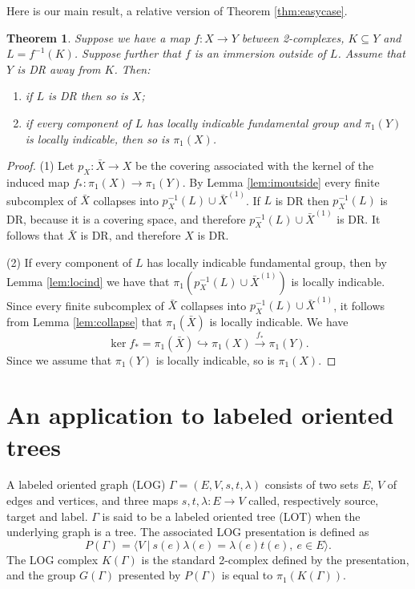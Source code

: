\documentclass[12pt]{amsart}
\newtheorem{thm}{Theorem}[section]
\theoremstyle{definition}
\begin{document}
Here is our main result, a relative version of Theorem \ref{thm:easycase}.

\begin{thm}\label{thm:good} Suppose we have a map $f\colon X\to Y$ between 2-complexes, $K\subseteq Y$ and $L=f^{-1}(K)$. Suppose further that $f$ is an immersion outside of $L$. Assume that $Y$ is DR away from $K$. Then:
\begin{enumerate}
    \item if $L$ is DR then so is $X$;
    \item if every component of $L$ has locally indicable fundamental group and $\pi_1(Y)$ is locally indicable, then so is $\pi_1(X)$.
\end{enumerate}
\end{thm}

\begin{proof} (1) Let $p_X\colon \bar X\to X $ be the covering associated with the kernel of the induced map $f_*\colon \pi_1(X)\to \pi_1(Y)$. By Lemma \ref{lem:imoutside} every finite subcomplex of $\bar X$ collapses into $p^{-1}_X(L)\cup\bar X^{(1)}$. If $L$ is DR then $p_X^{-1}(L)$ is DR, because it is a covering space, and therefore $p^{-1}_X(L)\cup\bar X^{(1)}$ is DR. It follows that $\bar X$ is DR, and therefore $X$ is DR. 

\noindent (2) If every component of $L$ has locally indicable fundamental group, then by Lemma \ref{lem:locind} we have that $\pi_1(p^{-1}_X(L)\cup\bar X^{(1)})$ is locally indicable. Since every finite subcomplex of $\bar X$ collapses into $p^{-1}_X(L)\cup\bar X^{(1)}$, it follows from Lemma \ref{lem:collapse} that $\pi_1(\bar X)$ is locally indicable. We have 
$$\ker f_*=\pi_1(\bar X)\hookrightarrow \pi_1(X)\stackrel{f_*}{\rightarrow} \pi_1(Y).$$
Since we assume that $\pi_1(Y)$ is locally indicable, so is $\pi_1(X)$.
\end{proof}


\section{An application to labeled oriented trees}

A labeled oriented graph (LOG) $\Gamma = (E, V, s, t, \lambda)$ consists of two sets $E$, $V$ of edges and vertices, and three maps $s, t, \lambda\colon E\to V$ called, respectively source, target and label. $\Gamma$ is said to be a labeled oriented tree (LOT) when the underlying graph is a tree. The associated LOG presentation is defined as
$$P(\Gamma)=\langle V\ |\  s(e)\lambda(e)=\lambda(e)t(e),\ e\in E \rangle.$$
The LOG complex $K(\Gamma)$ is the standard 2-complex defined by the presentation, and the group $G(\Gamma)$ presented by $P(\Gamma )$ is equal to $\pi_1(K(\Gamma))$. 
\end{document}
